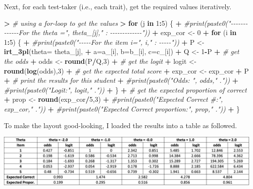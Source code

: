 \documentclass[
]{article}
\newenvironment{Shaded}{\begin{snugshade}}{\end{snugshade}}
\newcommand{\AttributeTok}[1]{\textcolor[rgb]{0.13,0.29,0.53}{#1}}
\newcommand{\CommentTok}[1]{\textcolor[rgb]{0.56,0.35,0.01}{\textit{#1}}}
\newcommand{\ControlFlowTok}[1]{\textcolor[rgb]{0.13,0.29,0.53}{\textbf{#1}}}
\newcommand{\DecValTok}[1]{\textcolor[rgb]{0.00,0.00,0.81}{#1}}
\newcommand{\ErrorTok}[1]{\textcolor[rgb]{0.64,0.00,0.00}{\textbf{#1}}}
\newcommand{\FunctionTok}[1]{\textcolor[rgb]{0.13,0.29,0.53}{\textbf{#1}}}
\newcommand{\NormalTok}[1]{#1}
\newcommand{\OtherTok}[1]{\textcolor[rgb]{0.56,0.35,0.01}{#1}}
\newcommand{\SpecialCharTok}[1]{\textcolor[rgb]{0.81,0.36,0.00}{\textbf{#1}}}
\begin{document}
Next, for each test-taker (i.e., each trait), get the required values
iteratively.

\begin{Shaded}
\begin{Highlighting}[]
\SpecialCharTok{\textgreater{}} \CommentTok{\# using a for{-}loop to get the values}
\ErrorTok{\textgreater{}} \ControlFlowTok{for}\NormalTok{ (j }\ControlFlowTok{in} \DecValTok{1}\SpecialCharTok{:}\DecValTok{5}\NormalTok{) \{}
\SpecialCharTok{+}   \CommentTok{\#print(paste0("{-}{-}{-}{-}{-}{-}{-}{-}{-}{-}{-}{-}{-}For the theta =", theta\_[j]," : {-}{-}{-}{-}{-}{-}{-}{-}{-}{-}{-}{-}{-}"))}
\SpecialCharTok{+}\NormalTok{   exp\_cor }\OtherTok{\textless{}{-}} \DecValTok{0}
\SpecialCharTok{+}   \ControlFlowTok{for}\NormalTok{ (i }\ControlFlowTok{in} \DecValTok{1}\SpecialCharTok{:}\DecValTok{5}\NormalTok{) \{}
\SpecialCharTok{+}     \CommentTok{\#print(paste0("{-}{-}{-}{-}{-}For the item i=", i," : {-}{-}{-}{-}{-}"))}
\SpecialCharTok{+}\NormalTok{     P }\OtherTok{\textless{}{-}} \FunctionTok{irt\_3pl}\NormalTok{(}\AttributeTok{theta=}\NormalTok{ theta\_[j], }
\SpecialCharTok{+}                  \AttributeTok{a=}\NormalTok{a\_[i], }\AttributeTok{b=}\NormalTok{b\_[i], }\AttributeTok{c=}\NormalTok{c\_[i])}
\SpecialCharTok{+}\NormalTok{     Q }\OtherTok{\textless{}{-}} \DecValTok{1}\SpecialCharTok{{-}}\NormalTok{P}
\SpecialCharTok{+}     \CommentTok{\# get the odds}
\SpecialCharTok{+}\NormalTok{     odds }\OtherTok{\textless{}{-}} \FunctionTok{round}\NormalTok{(P}\SpecialCharTok{/}\NormalTok{Q,}\DecValTok{3}\NormalTok{)}
\SpecialCharTok{+}     \CommentTok{\# get the logit}
\SpecialCharTok{+}\NormalTok{     logit }\OtherTok{\textless{}{-}} \FunctionTok{round}\NormalTok{(}\FunctionTok{log}\NormalTok{(odds),}\DecValTok{3}\NormalTok{)    }
\SpecialCharTok{+}     \CommentTok{\# get the expected total score}
\SpecialCharTok{+}\NormalTok{     exp\_cor }\OtherTok{\textless{}{-}}\NormalTok{ exp\_cor }\SpecialCharTok{+}\NormalTok{ P}
\SpecialCharTok{+}     \CommentTok{\# print the results for this student}
\SpecialCharTok{+}     \CommentTok{\#print(paste0("Odds: ", odds," ."))}
\SpecialCharTok{+}     \CommentTok{\#print(paste0("Logit:", logit," ."))}
\SpecialCharTok{+}\NormalTok{   \}}
\SpecialCharTok{+}   \CommentTok{\# get the expected proportion of correct}
\SpecialCharTok{+}\NormalTok{   prop }\OtherTok{\textless{}{-}} \FunctionTok{round}\NormalTok{(exp\_cor}\SpecialCharTok{/}\DecValTok{5}\NormalTok{,}\DecValTok{3}\NormalTok{)}
\SpecialCharTok{+}   \CommentTok{\#print(paste0("Expected Correct \#:", exp\_cor," ."))}
\SpecialCharTok{+}   \CommentTok{\#print(paste0("Expected Correct proportion:", prop," ."))}
\SpecialCharTok{+}\NormalTok{ \}}
\end{Highlighting}
\end{Shaded}

To make the layout good-looking, I loaded the results into a table as
followed.

\includegraphics{table_1.png}
\end{document}
